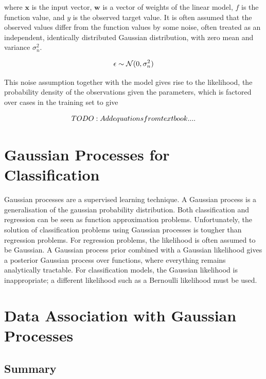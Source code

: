 \documentclass[12pt,a4paper]{report}
\begin{document}
where $\textbf{x}$ is the input vector, $\textbf{w}$ is a vector of weights of the linear model, $f$ is the function value, and $y$ is the observed target value.
It is often assumed that the observed values differ from the function values by some noise, often treated as an independent, identically distributed Gaussian distribution, with zero mean and variance $\sigma^2_{n}$.

\begin{equation}
    \centering
    \epsilon \sim \mathcal{N}(0, \sigma^2_{n})
\end{equation}

This noise assumption together with the model gives rise to the likelihood, the probability density of the observations given the parameters, which is factored over cases in the training set to give

\begin{equation}
    \centering
    TODO: Add equations from textbook ....
\end{equation}

\section{Gaussian Processes for Classification}

Gaussian processes are a supervised learning technique. 
A Gaussian process is a generalisation of the gaussian probability distribution. 
Both classification and regression can be seen as function approximation problems. 
Unfortunately, the solution of classification problems using Gaussian processes is tougher than regression problems. 
For regression problems, the likelihood is often assumed to be Gaussian. 
A Gaussian process prior combined with a Gaussian likelihood gives a posterior Gaussian process over functions, where everything remains analytically tractable. 
For classification models, the Gaussian likelihood is inappropriate; a different likelihood such as a Bernoulli likelihood must be used.

\citep{RasmussenWilliams2006}

\section{Data Association with Gaussian Processes}

\citep{Kaiser2018}
\citep{Lui2020}

\subsection{Summary}
\end{document}
